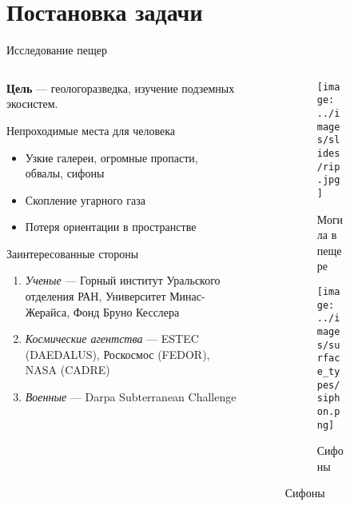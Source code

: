 \section{Постановка задачи}

\begin{frame}[t]{Исследование пещер}


    \begin{columns}[T,onlytextwidth]
        \begin{column}{0.59\textwidth}
            \small
                \textbf{Цель} --- геологоразведка, изучение подземных экосистем.
            \begin{exampleblock}{Непроходимые места для человека}
                \begin{itemize}
                    \item Узкие галереи, огромные пропасти, обвалы, сифоны
                    \item Скопление угарного газа
                    \item Потеря ориентации в пространстве
                \end{itemize}
            \end{exampleblock}
            \vspace{-0.2cm}
            \begin{alertblock}{Заинтересованные стороны}
                \begin{enumerate}
                    \item \textit{Ученые} --- Горный институт Уральского отделения РАН, Университет Минас-Жерайса, Фонд Бруно Кесслера
                    \item \textit{Космические агентства} --- ESTEC (DAEDALUS), Роскосмос (FEDOR), NASA (CADRE)
                    \item \textit{Военные} --- Darpa Subterranean Challenge
                \end{enumerate}
            \end{alertblock}
        \end{column}
        \begin{column}{0.39\textwidth}
            \begin{figure}[H]
                \begin{subfigure}{0.49\textwidth}
                    \centering\texttt{[image: ../images/slides/rip.jpg]}
                    \caption*{Могила в пещере}
                \end{subfigure}
                \begin{subfigure}{0.49\textwidth}
                    \centering\texttt{[image: ../images/surface\_types/siphon.png]}
                    \caption*{Сифоны}
                \end{subfigure}
            

\end{figure}
\end{column}
\end{columns}
\end{frame}
